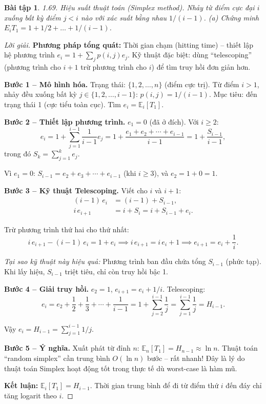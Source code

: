 \documentclass[8pt,a4paper]{article}
\newtheorem{exercise}{Bài tập}
\newenvironment{solution}{\begin{proof}[Lời giải]}{\end{proof}}
\newcommand{\E}{\mathbb{E}}
\begin{document}
\begin{exercise}
1.69. Hiệu suất thuật toán (Simplex method). Nhảy từ điểm cực đại $i$ xuống bất kỳ điểm $j < i$ nào với xác suất bằng nhau $1/(i-1)$.
(a) Chứng minh $E_i T_1 = 1 + 1/2 + \dots + 1/(i-1)$.
\end{exercise}
\begin{solution}
\textbf{Phương pháp tổng quát:} Thời gian chạm (hitting time) -- thiết lập hệ phương trình $e_i = 1 + \sum_j p(i,j) e_j$. Kỹ thuật đặc biệt: dùng ``telescoping'' (phương trình cho $i+1$ trừ phương trình cho $i$) để tìm truy hồi đơn giản hơn.

\textbf{Bước 1 -- Mô hình hóa.}
Trạng thái: $\{1, 2, \ldots, n\}$ (điểm cực trị). Từ điểm $i > 1$, nhảy đều xuống bất kỳ $j \in \{1, 2, \ldots, i-1\}$: $p(i, j) = 1/(i-1)$. Mục tiêu: đến trạng thái 1 (cực tiểu toàn cục). Tìm $e_i = \E_i[T_1]$.

\textbf{Bước 2 -- Thiết lập phương trình.}
$e_1 = 0$ (đã ở đích). Với $i \geq 2$:
\[
  e_i = 1 + \sum_{j=1}^{i-1} \frac{1}{i-1} e_j = 1 + \frac{e_1 + e_2 + \cdots + e_{i-1}}{i-1} = 1 + \frac{S_{i-1}}{i-1},
\]
trong đó $S_k = \sum_{j=1}^{k} e_j$.

Vì $e_1 = 0$: $S_{i-1} = e_2 + e_3 + \cdots + e_{i-1}$ (khi $i \geq 3$), và $e_2 = 1 + 0 = 1$.

\textbf{Bước 3 -- Kỹ thuật Telescoping.}
Viết cho $i$ và $i+1$:
\begin{align*}
  (i-1)\, e_i &= (i-1) + S_{i-1}, \\
  i\, e_{i+1} &= i + S_i = i + S_{i-1} + e_i.
\end{align*}

Trừ phương trình thứ hai cho thứ nhất:
\[
  i\, e_{i+1} - (i-1)\, e_i = 1 + e_i \implies i\, e_{i+1} = i\, e_i + 1 \implies e_{i+1} = e_i + \frac{1}{i}.
\]

\textit{Tại sao kỹ thuật này hiệu quả:} Phương trình ban đầu chứa tổng $S_{i-1}$ (phức tạp). Khi lấy hiệu, $S_{i-1}$ triệt tiêu, chỉ còn truy hồi bậc 1.

\textbf{Bước 4 -- Giải truy hồi.}
$e_2 = 1$, $e_{i+1} = e_i + 1/i$. Telescoping:
\[
  e_i = e_2 + \frac{1}{2} + \frac{1}{3} + \cdots + \frac{1}{i-1} = 1 + \sum_{j=2}^{i-1} \frac{1}{j} = \sum_{j=1}^{i-1} \frac{1}{j} = H_{i-1}.
\]

Vậy $\boxed{e_i = H_{i-1} = \sum_{j=1}^{i-1} 1/j}$.

\textbf{Bước 5 -- Ý nghĩa.}
Xuất phát từ đỉnh $n$: $\E_n[T_1] = H_{n-1} \approx \ln n$. Thuật toán ``random simplex'' cần trung bình $O(\ln n)$ bước -- rất nhanh! Đây là lý do thuật toán Simplex hoạt động tốt trong thực tế dù worst-case là hàm mũ.

\textbf{Kết luận:} $\E_i[T_1] = H_{i-1}$. Thời gian trung bình để đi từ điểm thứ $i$ đến đáy chỉ tăng logarit theo $i$.
\end{solution}
\end{document}
